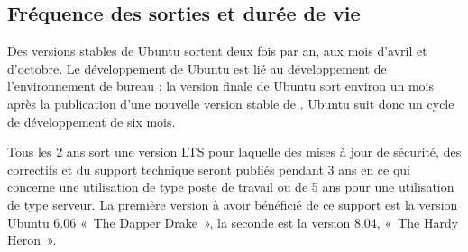 \subsection{Fréquence des sorties et durée de vie}
Des versions stables de Ubuntu sortent deux fois par an, aux mois d'avril et d'octobre. Le développement de Ubuntu est lié au développement de l'environnement de bureau  : la version finale de Ubuntu sort environ un mois après la publication d'une nouvelle version stable de . Ubuntu suit donc un cycle de développement de six mois.\par
Tous les 2 ans sort une version LTS pour laquelle des mises à jour de sécurité, des correctifs et du support technique seront publiés pendant 3 ans en ce qui concerne une utilisation de type poste de travail ou de 5 ans pour une utilisation de type serveur. La première version à avoir bénéficié de ce support est la version Ubuntu 6.06 «~The Dapper Drake~», la seconde est la version 8.04, «~The Hardy Heron~».
